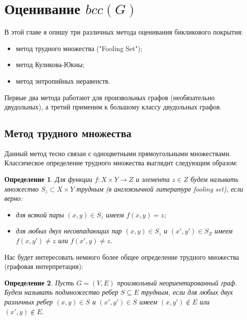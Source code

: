 \documentclass[a4paper]{article}
\newtheorem*{mdefinition}{Определение}
\begin{document}
\addtocounter{section}{1}
\section*{Оценивание $bcc(G)$}

В этой главе я опишу три различных метода оценивания бикликового покрытия:
\begin{itemize}[noitemsep]
	\item метод трудного множества ("Fooling Set");
	\item метод Куликова-Юкны;
	\item метод энтропийных неравенств.
\end{itemize}

Первые два метода работают для произвольных графов (необязательно двудольных), а третий применим к 
большому классу двудольных графов.

\setcounter{subsection}{0}

\subsection{Метод трудного множества}

Данный метод тесно связан с одноцветными прямоугольными множествами. Классическое определение 
трудного множества выглядит следующим образом:

\begin{mdefinition}
	Для функции $f: X\times Y \rightarrow Z$ и элемента $z\in Z$ будем называть множество 
	$S_z\subset X\times Y$ трудным (в англоязычной литературе fooling set), если верно:
	\begin{itemize}[noitemsep]
		\item для всякой пары $(x, y)\in S_z$ имеем $f(x, y) = z$;
		\item для любых двух несовпадающих пар $(x, y)\in S_z$ и $(x', y')\in S_Z$ имеем 
		$f(x, y') \neq z$ или $f(x', y) \neq z$.
	\end{itemize}
\end{mdefinition}

Нас будет интересовать немного более общее определение трудного множества (графовая интерпретация):
\begin{mdefinition}
	Пусть $G = (V, E)$ произвольный неориентированный граф. Будем называть подмножество ребер 
	$S \subseteq E$ трудным, если для любых двух различных ребер $(x, y)\in S$ и $(x', y')\in S$ 
	имеем $(x, y') \notin E$ или $(x', y) \notin E$.
\end{mdefinition}
\end{document}
